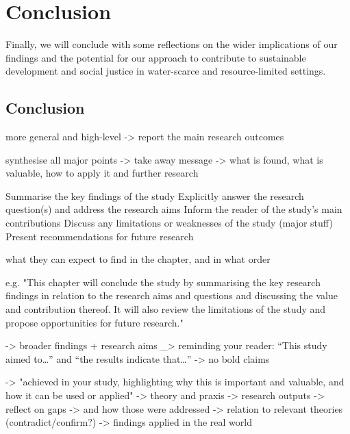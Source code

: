
\chapter{Conclusion} %

\label{ChapterX} %

Finally, we will conclude with some reflections on the wider implications of our findings and the potential for our approach to contribute to sustainable development and social justice in water-scarce and resource-limited settings.

\section{Conclusion}

more general and high-level -> report the main research outcomes

synthesise all major points -> take away message
-> what is found, what is valuable, how to apply it and further research

Summarise the key findings of the study
Explicitly answer the research question(s) and address the research aims
Inform the reader of the study’s main contributions
Discuss any limitations or weaknesses of the study (major stuff)
Present recommendations for future research



what they can expect to find in the chapter, and in what order

e.g. "This chapter will conclude the study by summarising the key research findings in relation to the research aims and questions and discussing the value and contribution thereof. It will also review the limitations of the study and propose opportunities for future research."

-> broader findings + research aims
_> reminding your reader: “This study aimed to…” and “the results indicate that…”
-> no bold claims

-> "achieved in your study, highlighting why this is important and valuable, and how it can be used or applied"
-> theory and praxis
-> research outputs
-> reflect on gaps -> and how those were addressed
-> relation to relevant theories (contradict/confirm?)
-> findings applied in the real world


